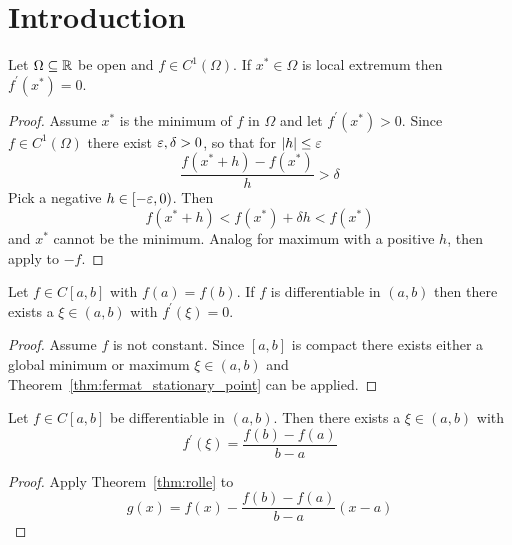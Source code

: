 
\newpage
\section{Introduction}

\begin{theorem}\label{thm:fermat_stationary_point}
Let \( \Omega \subseteq \mathbb{R} \) be open and \( f \in C^1(\Omega) \). If \( x^* \in \Omega \) is local extremum 
then \( f^\prime(x^*) = 0 \).
\end{theorem}

\begin{proof}
Assume \( x^* \) is the minimum of \( f \) in \( \Omega \) and let \( f^\prime(x^*) > 0 \). 
Since \( f \in C^1(\Omega) \) there exist \( \varepsilon, \delta > 0 \), so that for \( |h| \le \varepsilon \)
\[
    \frac{f(x^* + h) - f(x^*)}{h} > \delta
\]
Pick a negative \( h \in [-\varepsilon, 0) \). Then 
\[
     f(x^* + h) < f(x^*) +  \delta h < f(x^*) 
\]
and \( x^* \) cannot be the minimum. Analog for maximum with a positive \( h \), then apply to \( -f \).
\end{proof}
\bigskip


\begin{theorem}[Rolle]\label{thm:rolle}
Let \( f \in C[a,b] \) with \( f(a) = f(b) \). If \( f \) is differentiable in \( (a, b) \) then 
there exists a \( \xi \in (a,b) \) with \( f^\prime(\xi) = 0 \).
\end{theorem}

\begin{proof}
Assume \( f \) is not constant. Since \( [a,b] \) is compact there exists either a global minimum or maximum 
\( \xi \in (a,b) \) and Theorem~\ref{thm:fermat_stationary_point} can be applied.
\end{proof}
\bigskip


\begin{theorem}\label{thm:mean_value}
Let \( f \in C[a,b] \) be differentiable in \( (a, b) \). Then there exists a \( \xi \in (a,b) \) with 
\[
    f^\prime(\xi) = \frac{f(b) - f(a)}{b - a}
\]
\end{theorem}

\begin{proof}
Apply Theorem~\ref{thm:rolle} to 
\[
    g(x) = f(x) - \frac{f(b) - f(a)}{b - a} (x -a) 
\]
\end{proof}
\bigskip

